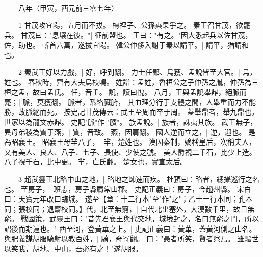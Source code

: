 　　八年（甲寅，西元前三零七年）

　　1 甘茂攻宜陽，五月而不拔。
	樗裡子、公孫奭果爭之。
	秦王召甘茂，欲罷兵。
	甘茂曰："息壤在彼。"|{
	征前盟也。
}
王曰："有之。"因大悉起兵以佐甘茂，|{
	佐，助也。
}
斬首六萬，遂拔宜陽。
	韓公仲侈入謝于秦以請平。|{
	請平，猶請和也。
}

　　2 秦武王好以力戲，|{
	好，呼到翻。
}
力士任鄙、烏獲、孟說皆至大官。|{
	烏，姓也。
	春秋時，齊有大夫烏枝鳴。
	姓譜：孟姓，魯桓公之子仲孫之胤，仲孫為三桓之孟，故曰孟氏。
	任，音壬。
	說，讀曰悅。
}
八月，王與孟說舉鼎，絕脈而薨；|{
	脈，莫獲翻。
	脈者，系絡臟腑， 其血理分行于支體之間，人舉重而力不能勝，故脈絕而死。
	按史記甘茂傳云：武王至周而卒于周。
	蓋舉鼎者，舉九鼎也。
	世家以為龍文赤鼎。
	史記"脈"作 "臏"。
}
族孟說。|{
	族者，誅夷其族。
}
武王無子，異母弟稷為質于燕，|{
	質，音致。
	燕，因肩翻。
}
國人逆而立之，|{
	逆，迎也。
}
是為昭襄王。
	昭襄王母羋八子，|{
	羋，楚姓也。
	漢因秦制，嫡稱皇后，次稱夫人，又有美人、良人、八子、七子、長使、少使之號。
	美人爵視二千石，比少上造。
	八子視千石，比中更。
	羋，亡氏翻。
}
楚女也，實宣太后。


　　3 趙武靈王北略中山之地，|{
	略地之師速而疾。
	杜預曰：略者，總攝巡行之名也。
}
至房子，|{
	班志，房子縣屬常山郡。
	史記正義曰：房子，今趙州縣。
	宋白曰：天寶元年改曰臨城。
}
遂至【章：十二行本"至"作"之"；乙十一行本同；孔本同；張校同；退齋校同。】代，北至無窮，|{
	自代北出塞外，大漠數千里，故日無窮。
	戰國策，武靈王曰："昔先君襄王與代交地，城境封之，名曰無窮之門，所以詔後而期遠也。"
	}
西至河，登黃華之上。|{
	史記正義曰：黃華，蓋黃河側之山名。
}
與肥義謀胡服騎射以教百姓，|{
	騎，奇寄翻。
}
曰："愚者所笑，賢者察焉。
	雖驅世以笑我，胡地、中山，吾必有之！"遂胡服。


